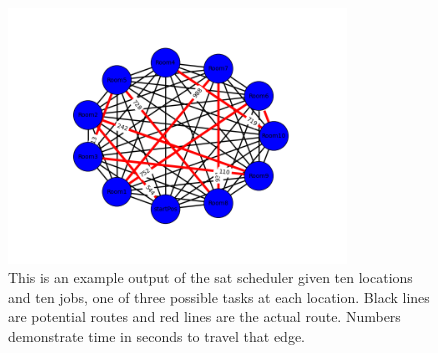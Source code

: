 \documentclass[11pt]{article}
\begin{document}
\begin{figure}
\centering
\includegraphics[width=0.8\textwidth]{Ten_Task_Result.png}
\caption{\label{fig:TenTaskResult}This is an example output of the sat scheduler given ten locations and ten jobs, one of three possible tasks at each location. Black lines are potential routes and red lines are the actual route. Numbers demonstrate time in seconds to travel that edge.}
\end{figure}
\end{document}
